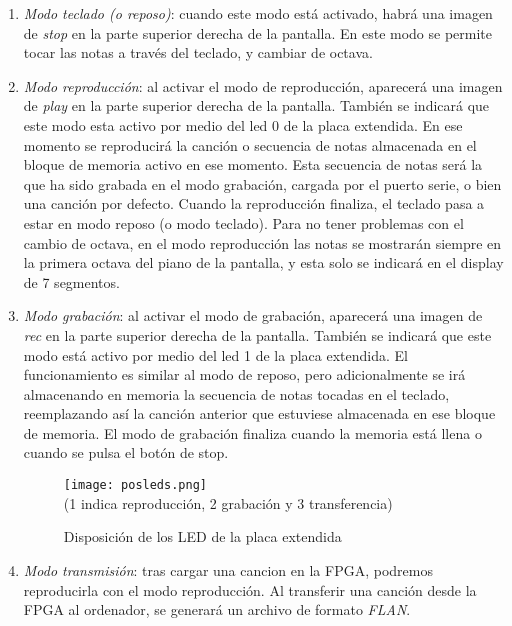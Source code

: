 \documentclass{article}
\begin{document}
	\begin{enumerate}
	\item {\itshape Modo teclado (o reposo)}: cuando este modo está activado, habrá una imagen de {\itshape stop} en la parte superior derecha de la pantalla. En este modo se permite tocar las notas a través del teclado, y cambiar de octava.

	\item {\itshape Modo reproducción}: al activar el modo de reproducción, aparecerá una imagen de {\itshape play} en la parte superior derecha de la pantalla. También se indicará que este modo esta activo por medio del led 0 de la placa extendida. En ese momento se reproducirá la canción o secuencia de notas almacenada en el bloque de memoria activo en ese momento. Esta secuencia de notas será la que ha sido grabada en el modo grabación, cargada por el puerto serie, o bien una canción por defecto. Cuando la reproducción finaliza, el teclado pasa a estar en modo reposo (o modo teclado).  Para no tener problemas con el cambio de octava, en el modo reproducción las notas se mostrarán siempre en la primera octava del piano de la pantalla, y esta solo se indicará en el display de 7 segmentos.

	\item {\itshape Modo grabación}: al activar el modo de grabación, aparecerá una imagen de {\itshape rec} en la parte superior derecha de la pantalla. También se indicará que este modo está activo por medio del led 1 de la placa extendida. El funcionamiento es similar al modo de reposo, pero adicionalmente se irá almacenando en memoria la secuencia de notas tocadas en el teclado, reemplazando así la canción anterior que estuviese almacenada en ese bloque de memoria. El modo de grabación finaliza cuando la memoria está llena o cuando se pulsa el botón de stop.

	\begin{figure}[ht] \centering
	\texttt{[image: posleds.png]} \\
	{\small (1 indica reproducción, 2 grabación y 3 transferencia)}
	\caption{Disposición de los LED de la placa extendida}
	\end{figure}

	\item {\itshape Modo transmisión}: tras cargar una cancion en la FPGA, podremos reproducirla con el modo reproducción. Al transferir una canción desde la FPGA al ordenador, se generará un archivo de formato {\itshape FLAN}.
	\end{enumerate}
	
\end{document}
